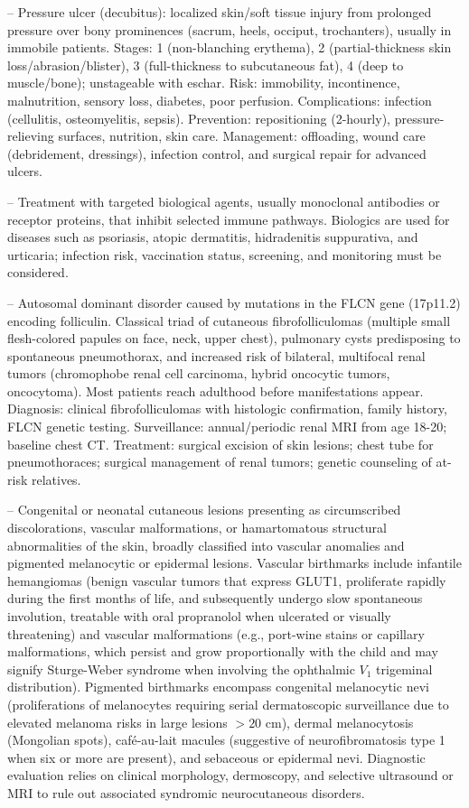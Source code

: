 -- Pressure ulcer (decubitus): localized skin/soft tissue injury from prolonged pressure over bony prominences (sacrum, heels, occiput, trochanters), usually in immobile patients. Stages: 1 (non-blanching erythema), 2 (partial-thickness skin loss/abrasion/blister), 3 (full-thickness to subcutaneous fat), 4 (deep to muscle/bone); unstageable with eschar. Risk: immobility, incontinence, malnutrition, sensory loss, diabetes, poor perfusion. Complications: infection (cellulitis, osteomyelitis, sepsis). Prevention: repositioning (2-hourly), pressure-relieving surfaces, nutrition, skin care. Management: offloading, wound care (debridement, dressings), infection control, and surgical repair for advanced ulcers.

-- Treatment with targeted biological agents, usually monoclonal antibodies or receptor proteins, that inhibit selected immune pathways. Biologics are used for diseases such as psoriasis, atopic dermatitis, hidradenitis suppurativa, and urticaria; infection risk, vaccination status, screening, and monitoring must be considered.

-- Autosomal dominant disorder caused by mutations in the FLCN gene (17p11.2) encoding folliculin. Classical triad of cutaneous fibrofolliculomas (multiple small flesh-colored papules on face, neck, upper chest), pulmonary cysts predisposing to spontaneous pneumothorax, and increased risk of bilateral, multifocal renal tumors (chromophobe renal cell carcinoma, hybrid oncocytic tumors, oncocytoma). Most patients reach adulthood before manifestations appear. Diagnosis: clinical fibrofolliculomas with histologic confirmation, family history, FLCN genetic testing. Surveillance: annual/periodic renal MRI from age 18-20; baseline chest CT. Treatment: surgical excision of skin lesions; chest tube for pneumothoraces; surgical management of renal tumors; genetic counseling of at-risk relatives.

-- Congenital or neonatal cutaneous lesions presenting as circumscribed discolorations, vascular malformations, or hamartomatous structural abnormalities of the skin, broadly classified into vascular anomalies and pigmented melanocytic or epidermal lesions. Vascular birthmarks include infantile hemangiomas (benign vascular tumors that express GLUT1, proliferate rapidly during the first months of life, and subsequently undergo slow spontaneous involution, treatable with oral propranolol when ulcerated or visually threatening) and vascular malformations (e.g., port-wine stains or capillary malformations, which persist and grow proportionally with the child and may signify Sturge-Weber syndrome when involving the ophthalmic $V_1$ trigeminal distribution). Pigmented birthmarks encompass congenital melanocytic nevi (proliferations of melanocytes requiring serial dermatoscopic surveillance due to elevated melanoma risks in large lesions $>20\text{ cm}$), dermal melanocytosis (Mongolian spots), café-au-lait macules (suggestive of neurofibromatosis type 1 when six or more are present), and sebaceous or epidermal nevi. Diagnostic evaluation relies on clinical morphology, dermoscopy, and selective ultrasound or MRI to rule out associated syndromic neurocutaneous disorders.

